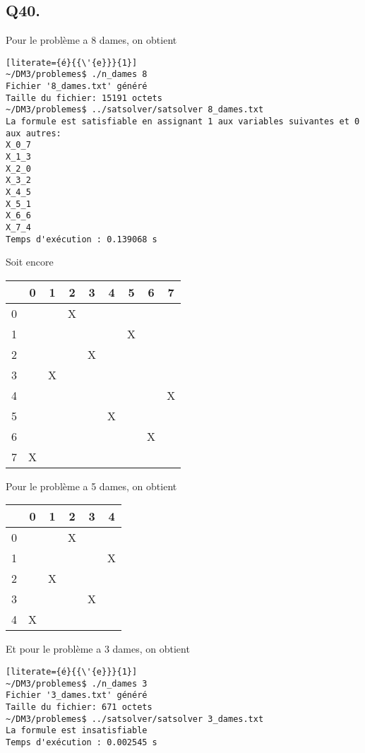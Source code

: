     \subsection*{Q40.}
    Pour le problème a 8 dames, on obtient
    \begin{lstlisting}[literate={é}{{\'{e}}}{1}]
~/DM3/problemes$ ./n_dames 8
Fichier '8_dames.txt' généré
Taille du fichier: 15191 octets
~/DM3/problemes$ ../satsolver/satsolver 8_dames.txt 
La formule est satisfiable en assignant 1 aux variables suivantes et 0 aux autres:
X_0_7
X_1_3
X_2_0
X_3_2
X_4_5
X_5_1
X_6_6
X_7_4
Temps d'exécution : 0.139068 s
    \end{lstlisting}
    Soit encore
    \begin{center}
        \begin{tabular}{| c || *{8}{c |}}
        \hline
          & 0 & 1 & 2 & 3 & 4 & 5 & 6 & 7 \\
        \hline
        \hline
        0 &   &   & X &   &   &   &   &   \\
        \hline
        1 &   &   &   &   &   & X &   &   \\
        \hline
        2 &   &   &   & X &   &   &   &   \\
        \hline
        3 &   & X &   &   &   &   &   &   \\
        \hline
        4 &   &   &   &   &   &   &   & X \\
        \hline
        5 &   &   &   &   & X &   &   &   \\
        \hline
        6 &   &   &   &   &   &   & X &   \\
        \hline
        7 & X &   &   &   &   &   &   &   \\
        \hline
        \end{tabular}
    \end{center}
    Pour le problème a 5 dames, on obtient
    \begin{center}
        \begin{tabular}{| c || *{5}{c |}}
        \hline
          & 0 & 1 & 2 & 3 & 4 \\
        \hline
        \hline
        0 &   &   & X &   &   \\
        \hline
        1 &   &   &   &   & X \\
        \hline
        2 &   & X &   &   &   \\
        \hline
        3 &   &   &   & X &   \\
        \hline
        4 & X &   &   &   &   \\
        \hline
        \end{tabular}
    \end{center}
    Et pour le problème a 3 dames, on obtient
    \begin{lstlisting}[literate={é}{{\'{e}}}{1}]
~/DM3/problemes$ ./n_dames 3
Fichier '3_dames.txt' généré
Taille du fichier: 671 octets
~/DM3/problemes$ ../satsolver/satsolver 3_dames.txt 
La formule est insatisfiable
Temps d'exécution : 0.002545 s
    \end{lstlisting}


